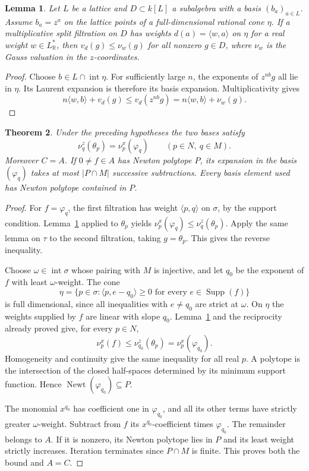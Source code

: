 \documentclass[11pt,reqno]{amsart}
\numberwithin{equation}{section}
\newtheorem{theorem}{Theorem}[section]
\newtheorem{lemma}[theorem]{Lemma}
\theoremstyle{definition}
\theoremstyle{remark}
\DeclareMathOperator{\Newt}{Newt}
\DeclareMathOperator{\Supp}{Supp}
\begin{document}
\begin{lemma}\label{lem:rec-straight}
Let \(L\) be a lattice and \(D\subset k[L]\) a subalgebra with a
basis \((b_a)_{a\in L}\).
Assume \(b_a=z^a\) on the lattice points of a full-dimensional rational
cone \(\eta\). If a multiplicative split filtration on \(D\) has weights
\(d(a)=\langle w,a\rangle\) on \(\eta\) for a real weight \(w\in L^*_{\mathbb R}\),
then \(v_d(g)\le\nu_w(g)\) for all nonzero \(g\in D\), where
\(\nu_w\) is the Gauss valuation in the \(z\)-coordinates.
\end{lemma}
\begin{proof}
Choose \(b\in L\cap\operatorname{int}\eta\). For sufficiently large
\(n\), the exponents of \(z^{nb}g\) all lie in \(\eta\).
Its Laurent expansion is therefore its basis expansion. Multiplicativity
gives
\[ n\langle w,b\rangle+v_d(g)\le v_d(z^{nb}g) =n\langle w,b\rangle+\nu_w(g). \]
\end{proof}

\begin{theorem}\label{thm:one-sided-return}
Under the preceding hypotheses the two bases satisfy
\[ \nu^z_q(\theta_p)=\nu^x_p(\varphi_q)\qquad (p\in N,\ q\in M). \]
Moreover \(C=A\). If \(0\ne f\in A\) has Newton polytope \(P\),
its expansion in the basis \((\varphi_q)\) takes at most
\(\lvert P\cap M\rvert\) successive subtractions. Every basis element
used has Newton polytope contained in \(P\).
\end{theorem}
\begin{proof}
For \(f=\varphi_q\), the first filtration has weight
\(\langle p,q\rangle\) on \(\sigma\), by the support condition.
Lemma~\ref{lem:rec-straight} applied to \(\theta_p\) yields
\(\nu^x_p(\varphi_q)\le\nu^z_q(\theta_p)\). Apply the same lemma
on \(\tau\) to the second filtration, taking \(g=\theta_p\).
This gives the reverse inequality.

Choose \(\omega\in\operatorname{int}\sigma\) whose pairing with \(M\)
is injective, and let \(q_0\) be the exponent of \(f\) with least
\(\omega\)-weight. The cone
\[ \eta=\{p\in\sigma:\langle p,e-q_0\rangle\ge0 \text{ for every }e\in\Supp (f)\} \]
is full dimensional, since all inequalities with \(e\ne q_0\) are
strict at \(\omega\). On \(\eta\) the weights supplied by \(f\) are
linear with slope \(q_0\). Lemma~\ref{lem:rec-straight} and the
reciprocity already proved give, for every \(p\in N\),
\[ \nu^x_p(f)\le\nu^z_{q_0}(\theta_p)=\nu^x_p(\varphi_{q_0}). \]
Homogeneity and continuity give the same inequality for all real \(p\).
A polytope is the intersection of the closed half-spaces determined by
its minimum support function. Hence
\(\Newt (\varphi_{q_0})\subseteq P\).

The monomial \(x^{q_0}\) has coefficient one in \(\varphi_{q_0}\),
and all its other terms have strictly greater \(\omega\)-weight.
Subtract from \(f\) its \(x^{q_0}\)-coefficient times \(\varphi_{q_0}\).
The remainder belongs to \(A\). If it is nonzero, its Newton polytope
lies in \(P\) and its least weight strictly increases.
Iteration terminates since \(P\cap M\) is finite. This proves both the
bound and \(A=C\).
\end{proof}
\end{document}

